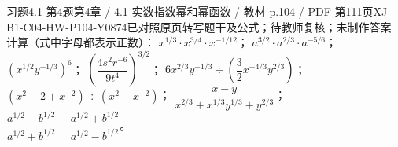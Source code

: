 \par\noindent\begin{minipage}{\linewidth}
\begin{bankitem}{习题4.1 第4题}{第4章 / 4.1 实数指数幂和幂函数 / 教材 p.104 / PDF 第111页}{XJ-B1-C04-HW-P104-Y0874}{已对照原页转写题干及公式；待教师复核；未制作答案}
计算（式中字母都表示正数）：
$x^{1/3}\cdot x^{3/4}\cdot x^{-1/12}$；
$a^{3/2}\cdot a^{2/3}\cdot a^{-5/6}$；
$\left(x^{1/2}y^{-1/3}\right)^6$；
$\left(\dfrac{4s^2r^{-6}}{9t^4}\right)^{3/2}$；
$6x^{2/3}y^{-1/3}\div\left(\dfrac32x^{-4/3}y^{2/3}\right)$；
$\left(x^2-2+x^{-2}\right)\div\left(x^2-x^{-2}\right)$；
$\dfrac{x-y}{x^{2/3}+x^{1/3}y^{1/3}+y^{2/3}}$；
$\dfrac{a^{1/2}-b^{1/2}}{a^{1/2}+b^{1/2}}-\dfrac{a^{1/2}+b^{1/2}}{a^{1/2}-b^{1/2}}$。
\end{bankitem}
\end{minipage}\par\medskip
